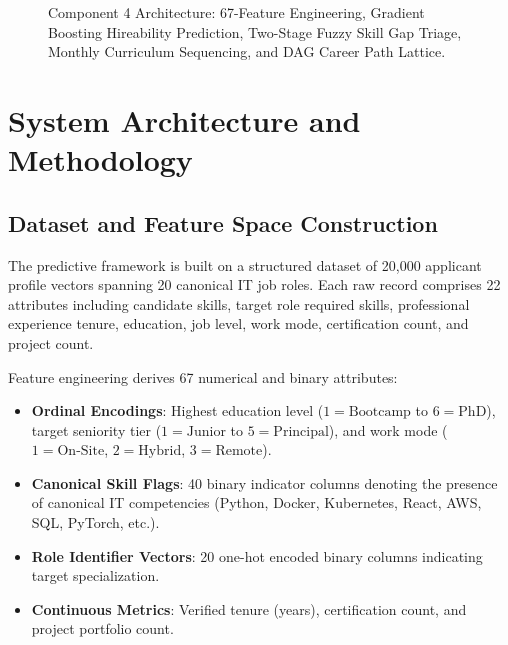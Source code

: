 \documentclass[conference]{IEEEtran}
\begin{document}
\begin{figure}[t]
\caption{Component 4 Architecture: 67-Feature Engineering, Gradient Boosting Hireability Prediction, Two-Stage Fuzzy Skill Gap Triage, Monthly Curriculum Sequencing, and DAG Career Path Lattice.}
\label{fig:c4_pipeline}
\end{figure}

\section{System Architecture and Methodology}

\subsection{Dataset and Feature Space Construction}
The predictive framework is built on a structured dataset of 20,000 applicant profile vectors spanning 20 canonical IT job roles. Each raw record comprises 22 attributes including candidate skills, target role required skills, professional experience tenure, education, job level, work mode, certification count, and project count.

Feature engineering derives 67 numerical and binary attributes:
\begin{itemize}
    \item \textbf{Ordinal Encodings}: Highest education level ($1 = \text{Bootcamp}$ to $6 = \text{PhD}$), target seniority tier ($1 = \text{Junior}$ to $5 = \text{Principal}$), and work mode ($1 = \text{On-Site}$, $2 = \text{Hybrid}$, $3 = \text{Remote}$).
    \item \textbf{Canonical Skill Flags}: 40 binary indicator columns denoting the presence of canonical IT competencies (Python, Docker, Kubernetes, React, AWS, SQL, PyTorch, etc.).
    \item \textbf{Role Identifier Vectors}: 20 one-hot encoded binary columns indicating target specialization.
    \item \textbf{Continuous Metrics}: Verified tenure (years), certification count, and project portfolio count.
\end{itemize}
\end{document}
